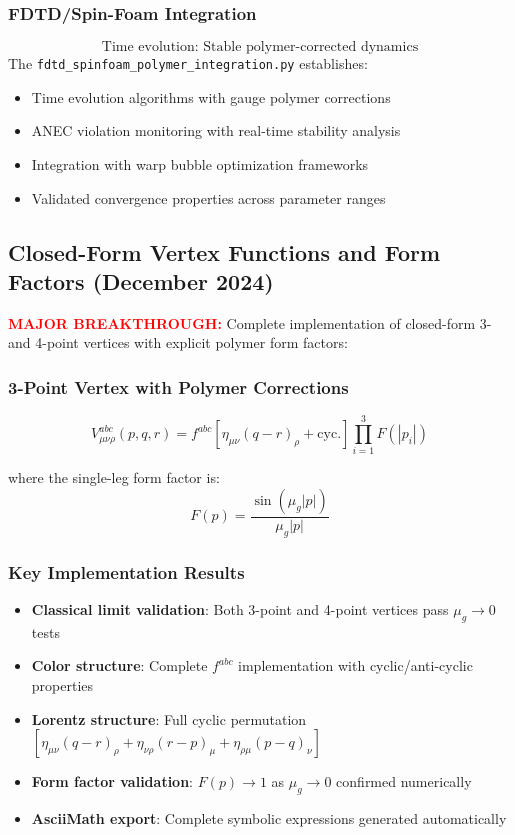 \documentclass[11pt]{article}
\begin{document}
\subsubsection*{FDTD/Spin-Foam Integration}
\[
  \boxed{\text{Time evolution: Stable polymer-corrected dynamics}}
\]
The \texttt{fdtd\_spinfoam\_polymer\_integration.py} establishes:
\begin{itemize}
  \item Time evolution algorithms with gauge polymer corrections
  \item ANEC violation monitoring with real-time stability analysis
  \item Integration with warp bubble optimization frameworks
  \item Validated convergence properties across parameter ranges
\end{itemize}

\subsection*{Closed-Form Vertex Functions and Form Factors (December 2024)}

\textcolor{red}{\textbf{MAJOR BREAKTHROUGH:}} Complete implementation of closed-form 3- and 4-point vertices with explicit polymer form factors:

\subsubsection*{3-Point Vertex with Polymer Corrections}
\[
  \boxed{V^{abc}_{\mu\nu\rho}(p,q,r) = f^{abc} \left[\eta_{\mu\nu}(q-r)_\rho + \text{cyc.}\right] \prod_{i=1}^3 F(|p_i|)}
\]

where the single-leg form factor is:
\[
  \boxed{F(p) = \frac{\sin(\mu_g |p|)}{\mu_g |p|}}
\]

\subsubsection*{Key Implementation Results}
\begin{itemize}
  \item \textbf{Classical limit validation}: Both 3-point and 4-point vertices pass $\mu_g \to 0$ tests
  \item \textbf{Color structure}: Complete $f^{abc}$ implementation with cyclic/anti-cyclic properties
  \item \textbf{Lorentz structure}: Full cyclic permutation $[\eta_{\mu\nu}(q-r)_\rho + \eta_{\nu\rho}(r-p)_\mu + \eta_{\rho\mu}(p-q)_\nu]$
  \item \textbf{Form factor validation}: $F(p) \to 1$ as $\mu_g \to 0$ confirmed numerically
  \item \textbf{AsciiMath export}: Complete symbolic expressions generated automatically
\end{itemize}
\end{document}
